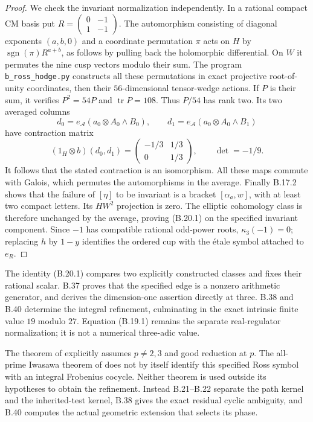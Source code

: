 \begin{proof}
We check the invariant normalization independently. In a
rational compact CM basis put
$R=\left(\begin{smallmatrix}0&-1\\1&-1\end{smallmatrix}\right)$.
The automorphism consisting of diagonal exponents $(a,b,0)$
and a coordinate permutation $\pi$ acts on $H$ by
$\operatorname{sgn}(\pi)R^{a+b}$, as follows by pulling
back the holomorphic differential. On $W$ it permutes the
nine cusp vectors modulo their sum.
The program \texttt{b\_ross\_hodge.py} constructs all these
permutations in exact projective root-of-unity coordinates,
then their $56$-dimensional tensor-wedge actions. If $P$
is their sum, it verifies $P^2=54P$ and
$\operatorname{tr}P=108$. Thus $P/54$ has rank two.
Its two averaged columns
\[
 d_0=e_{\mathcal A}(a_0\otimes A_0\wedge B_0),\qquad
 d_1=e_{\mathcal A}(a_0\otimes A_0\wedge B_1)
\]
have contraction matrix
\[
          (1_H\otimes b)(d_0,d_1)
          =\begin{pmatrix}-1/3&1/3\\0&1/3\end{pmatrix},
                  \qquad\det=-1/9.                            \tag{B.20.4}
\]
It follows that the stated contraction is an isomorphism.
All these maps commute with Galois, which permutes the
automorphisms in the average. Finally B.17.2 shows that the
failure of $[\eta]$ to be invariant is a bracket
$[\alpha_a,w]$, with at least two compact letters.
Its $HW^2$ projection is zero. The elliptic cohomology
class is therefore unchanged by the average, proving
(B.20.1) on the specified invariant component.
Since $-1$ has compatible rational odd-power roots,
$\kappa_3(-1)=0$; replacing $h$ by $1-y$ identifies the
ordered cup with the étale symbol attached to $e_R$.
\end{proof}

The identity (B.20.1) compares two explicitly constructed
classes and fixes their rational scalar. B.37 proves that
the specified edge is a nonzero arithmetic generator, and
derives the dimension-one assertion directly at three.
B.38 and B.40 determine the integral refinement, culminating
in the exact intrinsic finite value $19$ modulo $27$.
Equation (B.19.1) remains the separate real-regulator
normalization; it is not a numerical three-adic value.

The theorem of \citet[Theorem 1.1.5]{BKings2001}
explicitly assumes $p\ne2,3$ and good reduction at $p$.
The all-prime Iwasawa theorem of
\citet[Theorem 5.2]{BJohnsonLeungKings2011}
does not by itself identify this specified Ross symbol
with an integral Frobenius cocycle. Neither theorem is
used outside its hypotheses to obtain the refinement.
Instead B.21--B.22 separate the path kernel and the
inherited-test kernel, B.38 gives the exact residual
cyclic ambiguity, and B.40 computes the actual geometric
extension that selects its phase.

